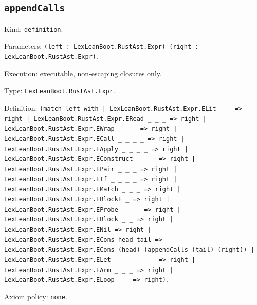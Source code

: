 \documentclass[11pt]{article}
\begin{document}
\subsection*{\texttt{appendCalls}}
\noindent Kind: \texttt{definition}.\par
\noindent Parameters: \texttt{(left : LexLeanBoot.RustAst.Expr) (right : LexLeanBoot.RustAst.Expr)}.\par
\noindent Execution: executable, non-escaping closures only.\par
\noindent Type: \texttt{LexLeanBoot.RustAst.Expr}.\par
\noindent Definition: \texttt{(match left with | LexLeanBoot.RustAst.Expr.ELit \_ \_ => right | LexLeanBoot.RustAst.Expr.ERead \_ \_ \_ => right | LexLeanBoot.RustAst.Expr.EWrap \_ \_ \_ => right | LexLeanBoot.RustAst.Expr.ECall \_ \_ \_ \_ => right | LexLeanBoot.RustAst.Expr.EApply \_ \_ \_ \_ => right | LexLeanBoot.RustAst.Expr.EConstruct \_ \_ \_ => right | LexLeanBoot.RustAst.Expr.EPair \_ \_ \_ => right | LexLeanBoot.RustAst.Expr.EIf \_ \_ \_ \_ => right | LexLeanBoot.RustAst.Expr.EMatch \_ \_ \_ => right | LexLeanBoot.RustAst.Expr.EBlockE \_ => right | LexLeanBoot.RustAst.Expr.EProbe \_ \_ \_ => right | LexLeanBoot.RustAst.Expr.EBlock \_ \_ => right | LexLeanBoot.RustAst.Expr.ENil => right | LexLeanBoot.RustAst.Expr.ECons head tail => LexLeanBoot.RustAst.Expr.ECons (head) (appendCalls (tail) (right)) | LexLeanBoot.RustAst.Expr.ELet \_ \_ \_ \_ \_ \_ => right | LexLeanBoot.RustAst.Expr.EArm \_ \_ \_ => right | LexLeanBoot.RustAst.Expr.ELoop \_ \_ => right)}.\par
\noindent Axiom policy: \texttt{none}.\par
\end{document}
